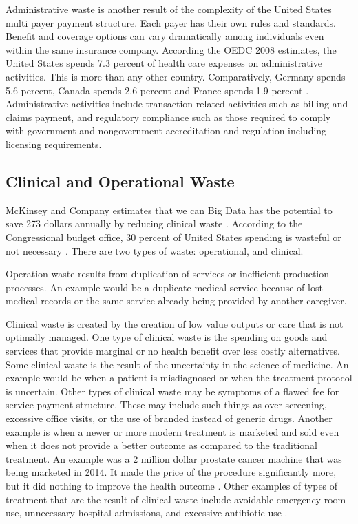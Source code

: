 \documentclass[sigconf]{acmart}
\begin{document}
Administrative waste is another result of the complexity of the United States multi payer payment structure. Each payer has their own rules and standards. Benefit and coverage options can vary dramatically among individuals even within the same insurance company.  According the OEDC 2008 estimates, the United States spends 7.3 percent of health care expenses on administrative activities. This is more than any other country. Comparatively, Germany spends 5.6 percent, Canada spends 2.6 percent and France spends 1.9 percent \cite{OEDC}.   Administrative activities include transaction related activities such as billing and claims payment, and regulatory compliance such as those required to comply with government and nongovernment accreditation and regulation including licensing requirements.

\subsection{Clinical and Operational Waste}

McKinsey and Company estimates that we can Big Data has the potential to save 273 dollars annually by reducing clinical waste \cite{springer}. According to the Congressional budget office, 30 percent of United States spending is wasteful or not necessary \cite{www-google-consumer}. There are two types of waste:  operational, and clinical. 


Operation waste results from duplication of services or inefficient production processes.  An example would be a duplicate medical service because of lost medical records or the same service already being provided by another caregiver.


Clinical waste is created by the creation of low value outputs or care that is not optimally managed. One type of clinical waste is the spending on goods and services that provide marginal or no health benefit over less costly alternatives.  Some clinical waste is the result of the uncertainty in the science of medicine. An example would be when a patient is misdiagnosed or when the treatment protocol is uncertain. Other types of clinical waste may be symptoms of a flawed fee for service payment structure. These may include such things as over screening, excessive office visits, or the use of branded instead of generic drugs.   Another example is when a newer or more modern treatment is marketed and sold even when it does not provide a better outcome as compared to the traditional treatment. An example was a 2 million dollar prostate cancer machine that was being marketed in 2014. It made the price of the procedure significantly more, but it did nothing to improve the health outcome \cite{www-google-consumer}.  Other examples of types of treatment that are the result of clinical waste include avoidable emergency room use, unnecessary hospital admissions, and excessive antibiotic use \cite{milbank}. 
 
\end{document}
